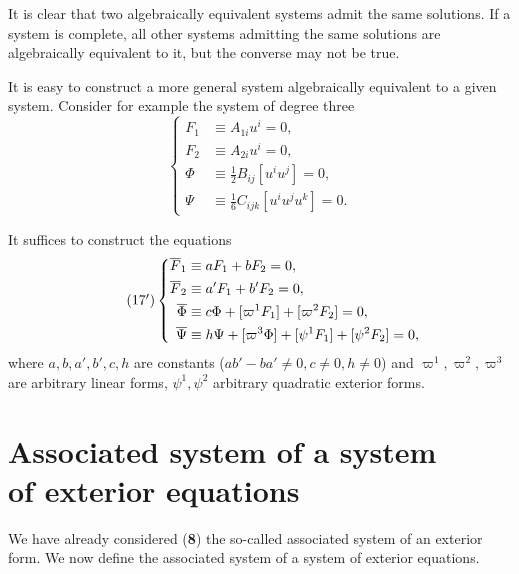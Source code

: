 It is clear that two algebraically equivalent systems admit the same solutions. If a system is complete, all other systems admitting the same solutions are algebraically equivalent to it, but the converse may not be true.

It is easy to construct a more general system algebraically equivalent to a given system. Consider for example the system of degree three
\begin{equation}
  \label{eq:17}
  \left\{
    \begin{aligned}
      F_{1}&\equiv A_{1i}u^{i}=0,\\
      F_{2}&\equiv A_{2i}u^{i}=0,\\
      \Phi&\equiv \frac{1}{2}B_{ij}[u^{i}u^{j}]=0,\\
      \Psi&\equiv \frac{1}{6}C_{ijk}[u^{i}u^{j}u^{k}]=0.
    \end{aligned}
  \right.
\end{equation}

It suffices to construct the equations
\begin{equation}
  \label{eq:17'}
  \tag{17$^{\prime}$}
  \left\{
    \begin{aligned}
      \overline{F}_{1}&\equiv aF_{1}+b F_{2}=0,\\
      \overline{F}_{2}&\equiv a'F_{1}+b'F_{2}=0,\\
      \overline\Phi&\equiv c\Phi+[\varpi^{1}F_{1}]+[\varpi^{2}F_{2}]=0,\\
      \overline\Psi&\equiv h\Psi+[\varpi^{3}\Phi]+[\psi^{1}F_{1}]+[\psi^{2}F_{2}]=0,\\
    \end{aligned}
  \right.
\end{equation}
where $a,b,a',b',c,h$ are constants ($ab'-ba'\neq 0,c\neq 0,h\neq 0$) and $\varpi^{1},\varpi^{2},\varpi^{3}$ are arbitrary linear forms, $\psi^{1},\psi^{2}$ arbitrary quadratic exterior forms.
\section[Associated system of a system of exterior equations]{Associated system of a system\\of exterior equations}
\label{sec:assoc-syst-syst}

\fsec We have already considered (\textsection\textbf{8})  the so-called associated system of an exterior form. We now define the associated system of a system of exterior equations. 


